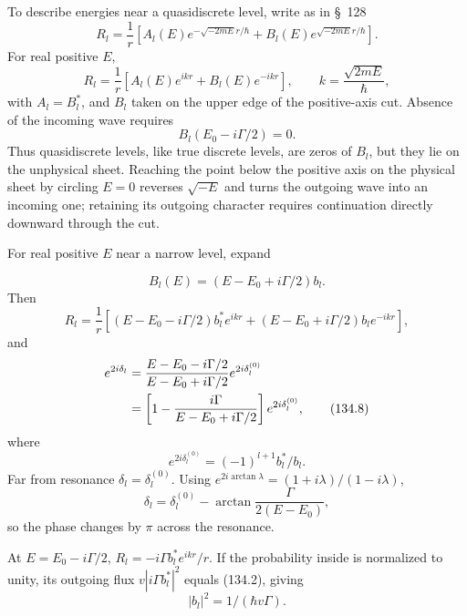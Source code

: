 To describe energies near a quasidiscrete level, write as in \S~128
\begin{equation}
 R_l=\frac1r\left[A_l(E)e^{-\sqrt{-2mE}r/\hbar}
 +B_l(E)e^{\sqrt{-2mE}r/\hbar}\right]. \tag{134.3}
\end{equation}
For real positive $E$,
\begin{equation}
 R_l=\frac1r[A_l(E)e^{ikr}+B_l(E)e^{-ikr}],\qquad
 k=\frac{\sqrt{2mE}}{\hbar}, \tag{134.4}
\end{equation}
with $A_l=B_l^*$, and $B_l$ taken on the upper edge of the positive-axis cut.
Absence of the incoming wave requires
\begin{equation} B_l(E_0-i\Gamma/2)=0. \tag{134.5}\end{equation}
Thus quasidiscrete levels, like true discrete levels, are zeros of $B_l$, but
they lie on the unphysical sheet. Reaching the point below the positive axis
on the physical sheet by circling $E=0$ reverses $\sqrt{-E}$ and turns the
outgoing wave into an incoming one; retaining its outgoing character requires
continuation directly downward through the cut.

For real positive $E$ near a narrow level, expand

\begin{equation} B_l(E)=(E-E_0+i\Gamma/2)b_l. \tag{134.6}\end{equation}
Then
\begin{equation}
 R_l=\frac1r[(E-E_0-i\Gamma/2)b_l^*e^{ikr}
 +(E-E_0+i\Gamma/2)b_le^{-ikr}], \tag{134.7}
\end{equation}
and
\begin{align}
 e^{2i\delta_l}&=\frac{E-E_0-i\Gamma/2}{E-E_0+i\Gamma/2}
 e^{2i\delta_l^{(0)}}\notag\\
 &=\left[1-\frac{i\Gamma}{E-E_0+i\Gamma/2}\right]
 e^{2i\delta_l^{(0)}}, \tag{134.8}
\end{align}
where
\begin{equation}e^{2i\delta_l^{(0)}}=(-1)^{l+1}b_l^*/b_l.\tag{134.9}\end{equation}
Far from resonance $\delta_l=\delta_l^{(0)}$. Using
$e^{2i\arctan\lambda}=(1+i\lambda)/(1-i\lambda)$,
\begin{equation}
 \delta_l=\delta_l^{(0)}-\arctan\frac{\Gamma}{2(E-E_0)}, \tag{134.10}
\end{equation}
so the phase changes by $\pi$ across the resonance.

At $E=E_0-i\Gamma/2$, $R_l=-i\Gamma b_l^*e^{ikr}/r$. If the probability
inside is normalized to unity, its outgoing flux $v|i\Gamma b_l^*|^2$ equals
(134.2), giving
\begin{equation}|b_l|^2=1/(\hbar v\Gamma).\tag{134.11}\end{equation}

